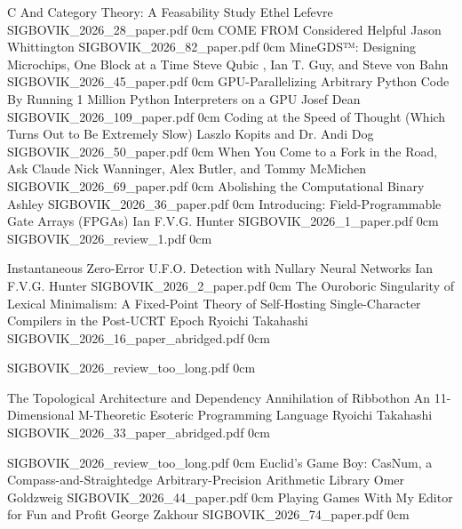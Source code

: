 \addpaper
	{C And Category Theory: A Feasability Study}
	{Ethel Lefevre}
	{}
	{SIGBOVIK_2026_28_paper.pdf}
	{0cm}
	{}
\addpaper
	{COME FROM Considered Helpful}
	{Jason Whittington}
	{}
	{SIGBOVIK_2026_82_paper.pdf}
	{0cm}
	{}
\addpaper
	{MineGDS™: Designing Microchips, One Block at a Time}
	{Steve Qubic , Ian T. Guy, and Steve von Bahn}
	{}
	{SIGBOVIK_2026_45_paper.pdf}
	{0cm}
	{}
\addpaper
	{GPU-Parallelizing Arbitrary Python Code By Running 1 Million Python Interpreters on a GPU}
	{Josef Dean}
	{}
	{SIGBOVIK_2026_109_paper.pdf}
	{0cm}
	{}
\addpaper
	{Coding at the Speed of Thought (Which Turns Out to Be Extremely Slow)}
	{Laszlo Kopits and Dr. Andi Dog}
	{}
	{SIGBOVIK_2026_50_paper.pdf}
	{0cm}
	{}
\addpaper
	{When You Come to a Fork in the Road, Ask Claude}
	{Nick Wanninger, Alex Butler, and Tommy McMichen}
	{}
	{SIGBOVIK_2026_69_paper.pdf}
	{0cm}
	{}
\addpaper
	{Abolishing the Computational Binary}
	{Ashley}
	{}
	{SIGBOVIK_2026_36_paper.pdf}
	{0cm}
	{}
\addpaper
	{Introducing: Field-Programmable Gate Arrays (FPGAs)}
	{Ian F.V.G. Hunter}
	{}
	{SIGBOVIK_2026_1_paper.pdf}
	{0cm}
	{}
\addreview
	{SIGBOVIK_2026_review_1.pdf}
	{0cm}

\addpaper
	{Instantaneous Zero-Error U.F.O. Detection with Nullary Neural Networks}
	{Ian F.V.G. Hunter}
	{}
	{SIGBOVIK_2026_2_paper.pdf}
	{0cm}
	{}
\addpaper
	{The Ouroboric Singularity of Lexical Minimalism: A Fixed-Point Theory of Self-Hosting Single-Character Compilers in the Post-UCRT Epoch}
	{Ryoichi Takahashi}
	{}
	{SIGBOVIK_2026_16_paper_abridged.pdf}
	{0cm}
	{}

\addreview
	{SIGBOVIK_2026_review_too_long.pdf}
	{0cm}


\addpaper
	{The Topological Architecture and Dependency Annihilation of Ribbothon An 11-Dimensional M-Theoretic Esoteric Programming Language}
	{Ryoichi Takahashi}
	{}
	{SIGBOVIK_2026_33_paper_abridged.pdf}
	{0cm}
	{}

\addreview
	{SIGBOVIK_2026_review_too_long.pdf}
	{0cm}
\addpaper
	{Euclid's Game Boy: CasNum, a Compass-and-Straightedge Arbitrary-Precision Arithmetic Library}
	{Omer Goldzweig}
	{}
	{SIGBOVIK_2026_44_paper.pdf}
	{0cm}
	{}
\addpaper
	{Playing Games With My Editor for Fun and Profit}
	{George Zakhour}
	{}
	{SIGBOVIK_2026_74_paper.pdf}
	{0cm}
	{}


